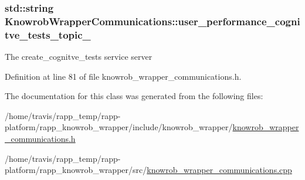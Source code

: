 \hypertarget{classKnowrobWrapperCommunications_a8304cf850b658cabf9a8494b6b745f1b}{
\subsubsection[{user\-\_\-performance\-\_\-cognitve\-\_\-tests\-\_\-topic\-\_\-}]{\setlength{\rightskip}{0pt plus 5cm}std\-::string Knowrob\-Wrapper\-Communications\-::user\-\_\-performance\-\_\-cognitve\-\_\-tests\-\_\-topic\-\_\-\hspace{0.3cm}{\ttfamily [private]}}}\label{classKnowrobWrapperCommunications_a8304cf850b658cabf9a8494b6b745f1b}
The create\-\_\-cognitve\-\_\-tests service server 

Definition at line 81 of file knowrob\-\_\-wrapper\-\_\-communications.\-h.



The documentation for this class was generated from the following files\-:\begin{DoxyCompactItemize}
\item 
/home/travis/rapp\-\_\-temp/rapp-\/platform/rapp\-\_\-knowrob\-\_\-wrapper/include/knowrob\-\_\-wrapper/\hyperlink{knowrob__wrapper__communications_8h}{knowrob\-\_\-wrapper\-\_\-communications.\-h}\item 
/home/travis/rapp\-\_\-temp/rapp-\/platform/rapp\-\_\-knowrob\-\_\-wrapper/src/\hyperlink{knowrob__wrapper__communications_8cpp}{knowrob\-\_\-wrapper\-\_\-communications.\-cpp}\end{DoxyCompactItemize}
